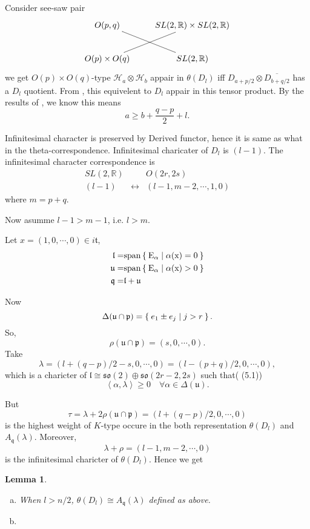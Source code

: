 \documentclass[12pt]{article}
\newtheorem{lemma}{Lemma}
\def\bR{{\mathbb{R}}}
\def\sspan{\rm{span}}
\def\inn#1#2{\left\langle{#1},{#2}\right\rangle}
\def\aso{\mathfrak{so}}
\def\fuu{\mathfrak{u}}
\def\fll{\mathfrak{l}}
\def\fpp{\mathfrak{p}}
\def\fqq{\mathfrak{q}}
\def\ftt{\mathfrak{t}}
\def\chh{\mathcal{H}}
\begin{document}
Consider see-saw pair 
\[
\xymatrix{
O(p,q) \ar@{-}[dr]& SL(2,\bR)\times SL(2,\bR) \\
O(p)\times O(q)\ar@{-}[ur] & SL(2,\bR)}
\] 
we get $O(p)\times O(q)$-type
 $\chh_a\otimes \chh_b$ appair in $\theta(D_{l})$ 
iff $D_{a+p/2}\otimes \overline{D_{b+q/2}}$ has a $D_{l}$ quotient.
From \cite{Howe1979Opq},
this equivelent to $D_{l}$ appair in this tensor product. 
By the results of \cite{Repka1976tensor}, we know this means
\[
a \geq b + \frac{q-p}{2} + l.
\]


Infinitesimal character is preserved by Derived functor, hence it is same as 
what in the theta-correspondence.
Infinitesimal charicater of $D_l$ is $(l-1)$. 
The infinitesimal character correspondence is 
\[
\begin{matrix}
 SL(2,\bR) & & O(2r,2s)\\
 (l-1) & \leftrightarrow & (l-1, m-2, \cdots, 1, 0)
\end{matrix}
\]
where $m=p+q$.

Now asumme $l-1>m-1$, i.e. $l>m$.

Let $x = (1, 0,\cdots, 0)\in i\ftt$,
\begin{align*}
\fll =& \sspan \Set{E_\alpha |\alpha(x) =0 }\\
\fuu =& \sspan \Set{E_\alpha |\alpha(x) >0 }\\
\fqq =& \fll+\fuu
\end{align*}

Now 
\[
\Delta(\fuu\cap \fpp) = \Set{e_1\pm e_j|j>r}.
\]
So, 
\[
\rho(\fuu\cap \fpp) = (s, 0, \cdots, 0).
\]
Take
\[
\lambda = (l+(q-p)/2-s, 0, \cdots, 0)=(l-(p+q)/2,0,\cdots, 0),
\]
which is a charicter of $\fll\cong \aso(2)\oplus \aso(2r-2,2s)$ 
such that(\cite{VoganZuckerman1984} (5.1))
\[
\inn{\alpha}{\lambda} \geq 0 \quad \forall \alpha \in \Delta(\fuu).
\]

But
\[
\tau = \lambda+2\rho(\fuu\cap\fpp) = (l+(q-p)/2, 0,\cdots, 0)
\]
is the highest weight of $K$-type occure in the both representation 
$\theta(D_l)$ and $A_\fqq(\lambda)$.
Moreover,
\[
\lambda + \rho = (l-1, m-2, \cdots, 0)
\]
is the infinitesimal charicter of $\theta(D_l)$. 
Hence we get
\begin{lemma}
\begin{enumerate}[a)]
\item When $l> n/2$, $\theta(D_l)\cong A_\fqq(\lambda)$ defined as above.
\item 
\end{enumerate}
\end{lemma}
\end{document}
